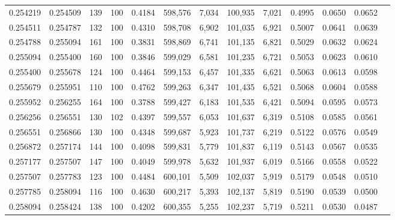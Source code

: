 \begin{tabular}{rrrrrrrrrrrrr}
0.254219 & 0.254509 &   139 & 100 &                                     0.4184 & 598,576 &   7,034 & 100,935 &   7,021 & 0.4995 & 0.0650 & 0.0652 \\
0.254511 & 0.254787 &   132 & 100 &                                     0.4310 & 598,708 &   6,902 & 101,035 &   6,921 & 0.5007 & 0.0641 & 0.0639 \\
0.254788 & 0.255094 &   161 & 100 &                                     0.3831 & 598,869 &   6,741 & 101,135 &   6,821 & 0.5029 & 0.0632 & 0.0624 \\
0.255094 & 0.255400 &   160 & 100 &                                     0.3846 & 599,029 &   6,581 & 101,235 &   6,721 & 0.5053 & 0.0623 & 0.0610 \\
0.255400 & 0.255678 &   124 & 100 &                                     0.4464 & 599,153 &   6,457 & 101,335 &   6,621 & 0.5063 & 0.0613 & 0.0598 \\
0.255679 & 0.255951 &   110 & 100 &                                     0.4762 & 599,263 &   6,347 & 101,435 &   6,521 & 0.5068 & 0.0604 & 0.0588 \\
0.255952 & 0.256255 &   164 & 100 &                                     0.3788 & 599,427 &   6,183 & 101,535 &   6,421 & 0.5094 & 0.0595 & 0.0573 \\
0.256256 & 0.256551 &   130 & 102 &                                     0.4397 & 599,557 &   6,053 & 101,637 &   6,319 & 0.5108 & 0.0585 & 0.0561 \\
0.256551 & 0.256866 &   130 & 100 &                                     0.4348 & 599,687 &   5,923 & 101,737 &   6,219 & 0.5122 & 0.0576 & 0.0549 \\
0.256872 & 0.257174 &   144 & 100 &                                     0.4098 & 599,831 &   5,779 & 101,837 &   6,119 & 0.5143 & 0.0567 & 0.0535 \\
0.257177 & 0.257507 &   147 & 100 &                                     0.4049 & 599,978 &   5,632 & 101,937 &   6,019 & 0.5166 & 0.0558 & 0.0522 \\
0.257507 & 0.257783 &   123 & 100 &                                     0.4484 & 600,101 &   5,509 & 102,037 &   5,919 & 0.5179 & 0.0548 & 0.0510 \\
0.257785 & 0.258094 &   116 & 100 &                                     0.4630 & 600,217 &   5,393 & 102,137 &   5,819 & 0.5190 & 0.0539 & 0.0500 \\
0.258094 & 0.258424 &   138 & 100 &                                     0.4202 & 600,355 &   5,255 & 102,237 &   5,719 & 0.5211 & 0.0530 & 0.0487 \\

\end{tabular}

